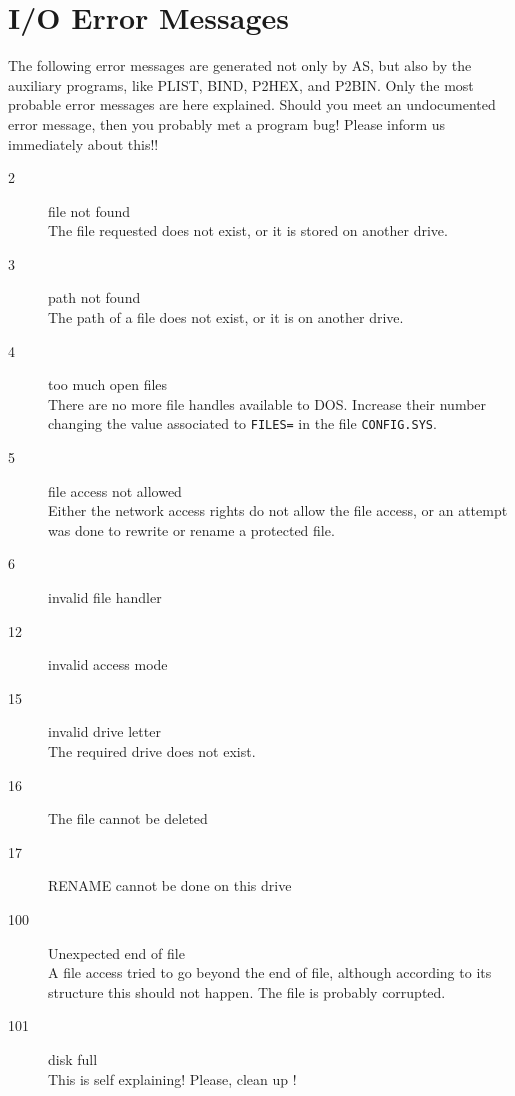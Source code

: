 \documentclass[12pt,twoside]{report}
\newcommand{\tty}[1]{{\tt #1}}
\begin{document}

\cleardoublepage
\chapter{I/O Error Messages}

The following error messages are generated not only by AS, but also by
the auxiliary programs, like PLIST, BIND, P2HEX, and P2BIN. Only the most
probable error messages are here explained. Should you meet an undocumented
error message, then you probably met a program bug! Please inform us
immediately about this!!

\begin{description}
\item[2]{file not found\\
         The file requested does not exist, or it is stored on another
         drive.}
\item[3]{path not found\\
         The path of a file does not exist, or it is on another drive.}
\item[4]{too much open files\\
         There are no more file handles available to DOS. Increase
         their number changing the value associated to \tty{FILES=} in the file
         \tty{CONFIG.SYS}.}
\item[5]{file access not allowed\\
         Either the network access rights do not allow the file access, or
         an attempt was done to rewrite or rename a protected file.}
\item[6]{invalid file handler}
\item[12]{invalid access mode}
\item[15]{invalid drive letter\\
         The required drive does not exist.}
\item[16]{The file cannot be deleted}
\item[17]{RENAME cannot be done on this drive}
\item[100]{Unexpected end of file\\
         A file access tried to go beyond the end of file, although according
         to its structure this should not happen. The file is probably
         corrupted.}
\item[101]{disk full\\
         This is self explaining! Please, clean up !}

\end{description}
\end{document}
